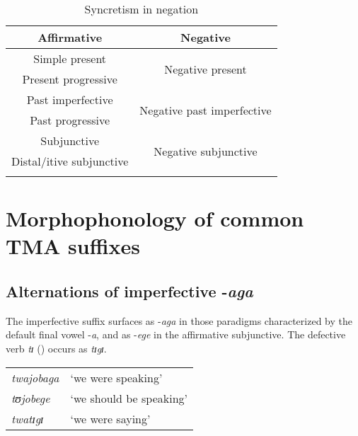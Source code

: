 \begin{table}[H]
\begin{center}
\begin{tabular}{cc}
\lsptoprule 
\footnotesize{Affirmative} & \footnotesize{Negative}\\ 
\midrule 
Simple present & \multirow{2}{*}{Negative present}\\
Present progressive & \\ \hline
Past imperfective & \multirow{2}{*}{Negative past imperfective}\\
Past progressive & \\ \hline
Subjunctive & \multirow{2}{*}{Negative subjunctive}\\
Distal/itive subjunctive& \\
\lspbottomrule
\end{tabular}
\caption{Syncretism in negation}
\label{tableSyncretismNegation}  
\end{center}
\end{table}

\newpage 
\section{Morphophonology of common TMA suffixes}
\subsection{Alternations of imperfective -\textit{aga}}\label{AlternationsIPFVaga} 
The imperfective suffix surfaces as -\textit{aga} in those paradigms characterized by the default final vowel -\textit{a}, and as -\textit{ege} in the affirmative subjunctive. The defective verb \textit{tɪ} () occurs as \textit{tɪgɪ}.
\begin{exe}
\ex
\begin{tabular}[t]{ll}
\textit{twajobaga}&`we were speaking'
\\\textit{tʊjobege}&\lq we should be speaking'
\\\textit{twatɪgɪ}&`we were saying'
\end{tabular}
\end{exe}

